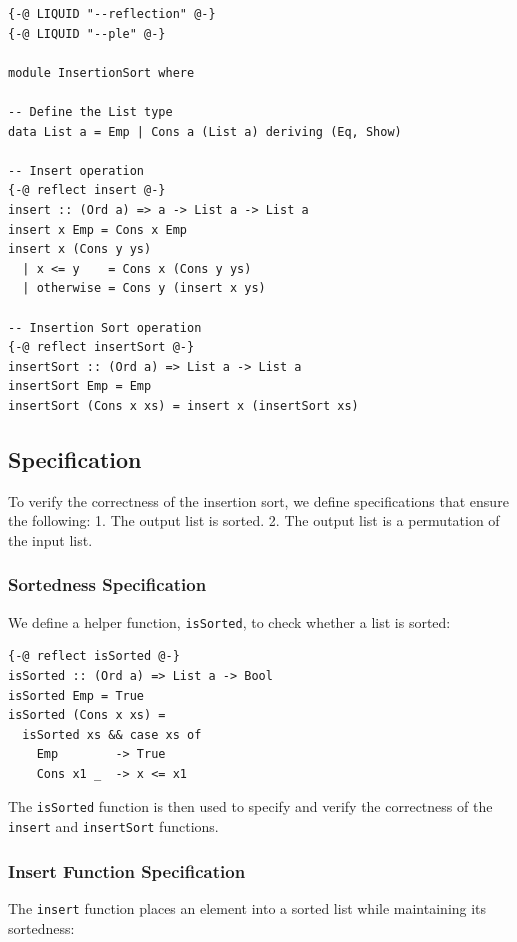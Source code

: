 \documentclass[]{rptuseminar}
\begin{document}
\begin{lstlisting}[caption=Insertion Sort Implementation]
{-@ LIQUID "--reflection" @-}
{-@ LIQUID "--ple" @-}

module InsertionSort where

-- Define the List type
data List a = Emp | Cons a (List a) deriving (Eq, Show)

-- Insert operation
{-@ reflect insert @-}
insert :: (Ord a) => a -> List a -> List a
insert x Emp = Cons x Emp
insert x (Cons y ys)
  | x <= y    = Cons x (Cons y ys)
  | otherwise = Cons y (insert x ys)

-- Insertion Sort operation
{-@ reflect insertSort @-}
insertSort :: (Ord a) => List a -> List a
insertSort Emp = Emp
insertSort (Cons x xs) = insert x (insertSort xs)
\end{lstlisting}

\subsection{Specification}

To verify the correctness of the insertion sort, we define specifications that ensure the following:
1. The output list is sorted.
2. The output list is a permutation of the input list.

\subsubsection{Sortedness Specification}

We define a helper function, \texttt{isSorted}, to check whether a list is sorted:

\begin{lstlisting}[caption=Sortedness Helper Function]
{-@ reflect isSorted @-}
isSorted :: (Ord a) => List a -> Bool
isSorted Emp = True
isSorted (Cons x xs) =
  isSorted xs && case xs of
    Emp        -> True
    Cons x1 _  -> x <= x1
\end{lstlisting}

The \texttt{isSorted} function is then used to specify and verify the correctness of the \texttt{insert} and \texttt{insertSort} functions.

\subsubsection{Insert Function Specification}

The \texttt{insert} function places an element into a sorted list while maintaining its sortedness:
\end{document}
